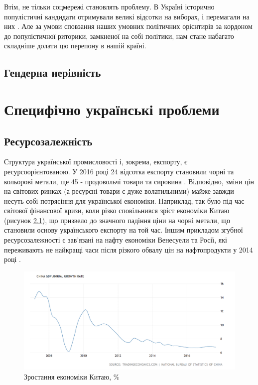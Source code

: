         Втім, не тільки соцмережі становлять проблему. В Україні історично популістичні кандидати отримували великі
        відсотки на виборах, і перемагали на них \cite{Elections}. Але за умови сповзання наших умовних політичних 
        орієнтирів за кордоном до популістичної риторики, замкненої на собі політики, нам стане набагато складніше 
        долати цю перепону в нашій країні.

        \section{Гендерна нерівність}

    \chapter{Специфічно українські проблеми}\label{sec:ukraine}
        \section{Ресурсозалежність}

        Структура української промисловості і, зокрема, експорту, є ресурсоорієнтованою. У 2016 році 
        24 відсотка експорту становили чорні та кольорові метали, ще 45 - продовольчі товари та сировина
        \cite{export2016}. Відповідно, зміни цін на світових ринках (а ресурсні товари є дуже волатильними)
        майже завжди несуть собі потрясіння для української економіки. Наприклад, так було під час світової фінансової
        кризи, коли різко сповільнився \cite{chinagdp} зріст економіки Китаю (рисунок \ref{fig:china}), що призвело
        до значного падіння ціни на чорні метали, що становили основу українського експорту на той час. Іншим
        прикладом згубної ресурсозалежності є зав'язані на нафту економіки Венесуели та Росії,
        які переживають не найкращі часи після різкого обвалу цін на нафтопродукти у 2014 році \cite{brent}.

        \begin{figure}[!htp]
            \centering
            \includegraphics[scale = 0.4]{PNG/china.png}
            \caption{Зростання економіки Китаю, \%}
            \label{fig:china}
        \end{figure}

